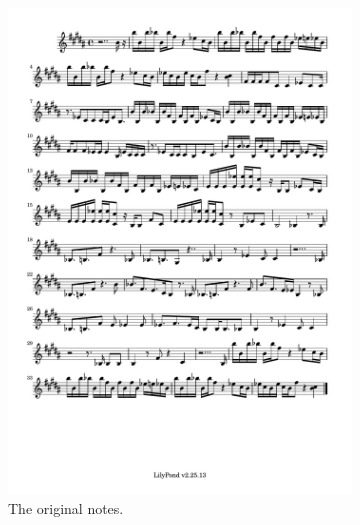 \documentclass[11pt]{article}
\theoremstyle{definition}
\begin{document}
\begin{figure}
\begin{subfigure}{\textwidth}
\centering
\includegraphics[trim=1cm 26.5cm 1cm 0.5cm, clip, scale=0.8]{Original_ATM.pdf}
\caption{The original notes.} 
\label{fig:OATM}
\end{subfigure}
\begin{subfigure}{\textwidth}
\centering

\end{subfigure}
\end{figure}
\end{document}
